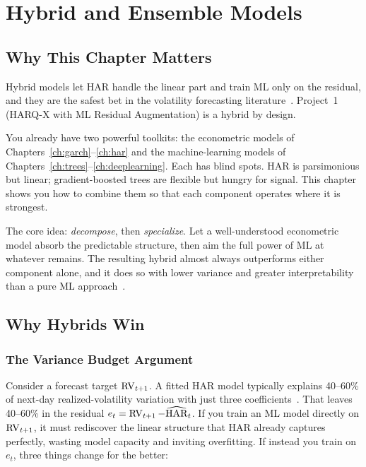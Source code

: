 \chapter{Hybrid and Ensemble Models}\label{ch:hybrid}

\section{Why This Chapter Matters}

\begin{application}
Hybrid models let HAR handle the linear part and train ML only on the
residual, and they are the safest bet in the
volatility forecasting literature~\citep{RahimikiaPoon2020}.  Project~1
(HARQ-X with ML Residual Augmentation) is a hybrid by design.
\end{application}

You already have two powerful toolkits: the econometric models of
Chapters~\ref{ch:garch}--\ref{ch:har} and the machine-learning models of
Chapters~\ref{ch:trees}--\ref{ch:deeplearning}.  Each has blind spots.
HAR is parsimonious but linear; gradient-boosted trees are flexible but
hungry for signal.  This chapter shows you how to combine them so that
each component operates where it is strongest.

The core idea: \emph{decompose}, then \emph{specialize}.
Let a well-understood econometric model absorb the predictable structure,
then aim the full power of ML at whatever remains.  The resulting hybrid
almost always outperforms either component alone, and it does so with
lower variance and greater interpretability than a pure ML
approach~\citep{RahimikiaPoon2020}.


\section{Why Hybrids Win}\label{sec:hybrid:why}

\subsection{The Variance Budget Argument}

Consider a forecast target $\operatorname{RV}_{t+1}$.  A fitted HAR model typically
explains 40--60\% of next-day realized-volatility variation with just three
coefficients~\citep{RahimikiaPoon2020}.  That leaves 40--60\% in the
residual $e_t = \operatorname{RV}_{t+1} - \widehat{\operatorname{HAR}}_t$.  If you train an ML model
directly on $\operatorname{RV}_{t+1}$, it must rediscover the linear structure that HAR
already captures perfectly, wasting model capacity and inviting overfitting.
If instead you train on $e_t$, three things change for the better:

